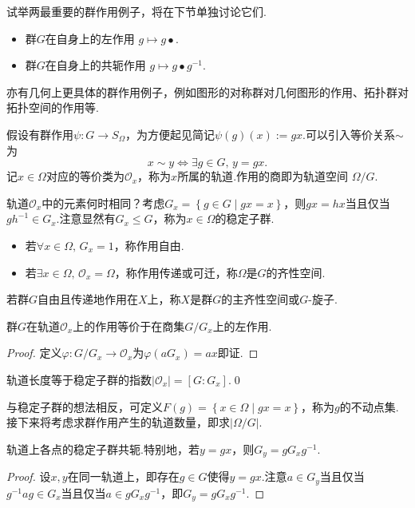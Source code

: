试举两最重要的群作用例子，将在下节单独讨论它们.
\begin{itemize}
	\item 群$G$在自身上的{\heiti 左作用} $g\mapsto g\bullet$.
	\item 群$G$在自身上的{\heiti 共轭作用} $g\mapsto g\bullet g^{-1}$.
\end{itemize}
亦有几何上更具体的群作用例子，例如图形的对称群对几何图形的作用、拓扑群对拓扑空间的作用等.

假设有群作用$\psi\colon G\to S_\Omega$，为方便起见简记$\psi(g)(x):=gx$.可以引入等价关系$\sim$为
\[
	x\sim y\iff\exists g\in G,\,y=gx.
\]
记$x\in\Omega$对应的等价类为$\mathcal{O}_x$，称为$x$所属的{\heiti 轨道}.作用的{\heiti 商}即为{\heiti 轨道空间} $\Omega/G$.

轨道$\mathcal{O}_x$中的元素何时相同？考虑$G_x=\left\{g\in G\mid gx=x\right\}$，则$gx=hx$当且仅当$gh^{-1}\in G_x$.注意显然有$G_x\le G$，称为$x\in\Omega$的{\heiti 稳定子群}.

\begin{itemize}
	\item 若$\forall x\in\Omega,\,G_x=1$，称作用{\heiti 自由}.
	\item 若$\exists x\in\Omega,\,\mathcal{O}_x=\Omega$，称作用{\heiti 传递}或{\heiti 可迁}，称$\Omega$是$G$的{\heiti 齐性空间}.
\end{itemize}
\begin{remark}
	若群$G$自由且传递地作用在$X$上，称$X$是群$G$的{\heiti 主齐性空间}或$G${\heiti -旋子}.
\end{remark}
\begin{prop}
	群$G$在轨道$\mathcal{O}_x$上的作用等价于在商集\footnotemark $G/G_x$上的左作用.
\end{prop}
\begin{proof}
	定义$\varphi\colon G/G_x\to \mathcal{O}_x$为$\varphi(aG_x)=ax$即证.
\end{proof}
\begin{cor*}
	轨道长度等于稳定子群的指数$|\mathcal{O}_x|=[G:G_x]$.\qed
\end{cor*}

与稳定子群的想法相反，可定义$F(g)=\left\{x\in\Omega\mid gx=x\right\}$，称为$g$的{\heiti 不动点集}.接下来将考虑求群作用产生的轨道数量，即求$|\Omega/G|$.
\begin{lemma*}
	轨道上各点的稳定子群共轭.特别地，若$y=gx$，则$G_y=gG_xg^{-1}$.
\end{lemma*}
\begin{proof}
	设$x,y$在同一轨道上，即存在$g\in G$使得$y=gx$.注意$a\in G_y$当且仅当$g^{-1}ag\in G_x$当且仅当$a\in gG_xg^{-1}$，即$G_y=gG_xg^{-1}$.
\end{proof}


